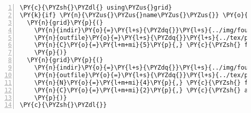 \begin{Verbatim}[commandchars=\\\{\},numbers=left,numbersep=0.5em]
\PY{c}{\PYZsh{}\PYZdl{} using\PYZus{}grid}
\PY{k}{if} \PY{n}{\PYZus{}\PYZus{}name\PYZus{}\PYZus{}} \PY{o}{==} \PY{l+s}{\PYZdq{}}\PY{l+s}{\PYZus{}\PYZus{}main\PYZus{}\PYZus{}}\PY{l+s}{\PYZdq{}}\PY{p}{:}
  \PY{n}{grid}\PY{p}{(}
    \PY{n}{indir}\PY{o}{=}\PY{l+s}{\PYZdq{}}\PY{l+s}{../img/fouriers}\PY{l+s}{\PYZdq{}}\PY{p}{,} 
    \PY{n}{outfile}\PY{o}{=}\PY{l+s}{\PYZdq{}}\PY{l+s}{../tex/pieces/grid.tex}\PY{l+s}{\PYZdq{}}\PY{p}{,}
    \PY{n}{C}\PY{o}{=}\PY{l+m+mi}{5}\PY{p}{,} \PY{c}{\PYZsh{} five columns, all images}
    \PY{p}{)}
  \PY{n}{grid}\PY{p}{(}
    \PY{n}{indir}\PY{o}{=}\PY{l+s}{\PYZdq{}}\PY{l+s}{../img/fouriers}\PY{l+s}{\PYZdq{}}\PY{p}{,}
    \PY{n}{outfile}\PY{o}{=}\PY{l+s}{\PYZdq{}}\PY{l+s}{../tex/pieces/closeup.tex}\PY{l+s}{\PYZdq{}}\PY{p}{,}
    \PY{n}{N}\PY{o}{=}\PY{l+m+mi}{4}\PY{p}{,} \PY{c}{\PYZsh{} four images total}
    \PY{n}{C}\PY{o}{=}\PY{l+m+mi}{2}\PY{p}{,} \PY{c}{\PYZsh{} across two columns}
    \PY{p}{)}
\PY{c}{\PYZsh{}\PYZdl{}}
\end{Verbatim}
